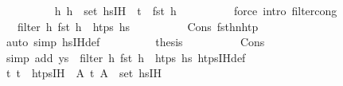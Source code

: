 \begin{isabellebody}
\ \ \ \ \ \ \ \ \isamarkupfalse%
\ {\isacartoucheopen}{\isasymAnd}h{\isacharprime}{\kern0pt}{\isachardot}{\kern0pt}\ h{\isacharprime}{\kern0pt}\ {\isasymin}\ set\ {\isacharparenleft}{\kern0pt}hs{\isacharprime}{\kern0pt}{\isacharunderscore}{\kern0pt}IH{\isacharparenright}{\kern0pt}\ {\isasymLongrightarrow}\ t{\isacharprime}{\kern0pt}\ {\isasymnoteq}\ fst\ h{\isacharprime}{\kern0pt}{\isacartoucheclose}\isanewline
\ \ \ \ \ \ \ \ \isamarkupfalse%
\ {\isacharparenleft}{\kern0pt}force\ intro{\isacharbang}{\kern0pt}{\isacharcolon}{\kern0pt}\ filter{\isacharunderscore}{\kern0pt}cong{\isacharparenright}{\kern0pt}\isanewline
\ \ \ \ \ \ \isamarkupfalse%
\ \isamarkupfalse%
\ {\isachardoublequoteopen}{\isachardot}{\kern0pt}{\isachardot}{\kern0pt}{\isachardot}{\kern0pt}\ {\isacharequal}{\kern0pt}\ filter\ {\isacharparenleft}{\kern0pt}{\isasymlambda}h{\isachardot}{\kern0pt}\ fst\ h\ {\isasymin}\ htps{\isacharparenright}{\kern0pt}\ hs{}{\isacharprime}{\kern0pt}{\isachardoublequoteclose}\isanewline
\ \ \ \ \ \ \ \ \isamarkupfalse%
\ Cons\ fst{\isacharunderscore}{\kern0pt}h{}{\isacharprime}{\kern0pt}{\isacharunderscore}{\kern0pt}n{\isacharunderscore}{\kern0pt}htp\isanewline
\ \ \ \ \ \ \ \ \isamarkupfalse%
\ {\isacharparenleft}{\kern0pt}auto\ simp{\isacharcolon}{\kern0pt}\ hs{\isacharprime}{\kern0pt}{\isacharunderscore}{\kern0pt}IH{\isacharunderscore}{\kern0pt}def{\isacharparenright}{\kern0pt}\isanewline
\ \ \ \ \ \ \isamarkupfalse%
\ \isamarkupfalse%
\ {\isacharquery}{\kern0pt}thesis\isanewline
\ \ \ \ \ \ \ \ \isamarkupfalse%
\ Cons\isanewline
\ \ \ \ \ \ \ \ \isamarkupfalse%
\ {\isacharparenleft}{\kern0pt}simp\ add{\isacharcolon}{\kern0pt}\ {\isacartoucheopen}ys\ {\isacharequal}{\kern0pt}\ filter\ {\isacharparenleft}{\kern0pt}{\isasymlambda}h{\isachardot}{\kern0pt}\ fst\ h\ {\isasymin}\ htps{\isacharparenright}{\kern0pt}\ hs{}{\isacharprime}{\kern0pt}{\isacartoucheclose}\ htps{\isacharunderscore}{\kern0pt}IH{\isacharunderscore}{\kern0pt}def{\isacharparenright}{\kern0pt}\isanewline
\ \ \ \ \isamarkupfalse%
\isanewline
\ \ \ \ \isamarkupfalse%
\ \isamarkupfalse%
\ {\isachardoublequoteopen}{\isasymAnd}t{\isacharprime}{\kern0pt}{\isachardot}{\kern0pt}\ t{\isacharprime}{\kern0pt}\ {\isasymin}\ htps{\isacharunderscore}{\kern0pt}IH\ {\isasymLongrightarrow}\ {\isasymexists}A{\isachardot}{\kern0pt}\ {\isacharparenleft}{\kern0pt}t{\isacharprime}{\kern0pt}{\isacharcomma}{\kern0pt}\ A{\isacharparenright}{\kern0pt}\ {\isasymin}\ set\ {\isacharparenleft}{\kern0pt}hs{\isacharunderscore}{\kern0pt}IH{\isacharparenright}{\kern0pt}{\isachardoublequoteclose}\isanewline

\end{isabellebody}
